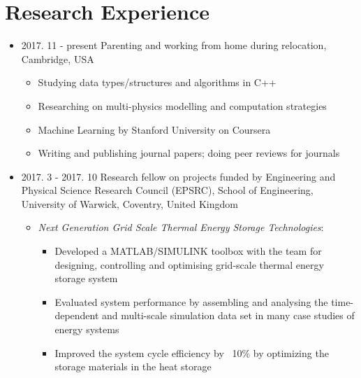 \documentclass[letterpaper]{article}
\begin{document}
\vspace{-12pt}
\section*{Research Experience}
\vspace{-10pt}
\begin{itemize}
\item 2017. 11 - present \hspace{2pt} Parenting and working from home during relocation, Cambridge, USA
		\begin{itemize}
		\item Studying data types/structures and algorithms in C++
		\item Researching on multi-physics modelling and computation strategies
		\item Machine Learning by Stanford University on Coursera
		\item Writing and publishing journal papers; doing peer reviews for journals
		\end{itemize}		
\item 2017. 3 - 2017. 10  \hspace{2pt} Research fellow on projects funded by Engineering and Physical Science Research Council (EPSRC), School of Engineering, University of Warwick, Coventry, United Kingdom
		\begin{itemize}
		\item \textsl{	Next Generation Grid Scale Thermal Energy Storage Technologies}: 
					\begin{itemize}
					\item Developed a MATLAB/SIMULINK toolbox with the team for designing, controlling and optimising grid-scale thermal energy storage system%
					\item Evaluated system performance by assembling and analysing the time-dependent and multi-scale simulation data set in many case studies of energy systems
					\item Improved the system cycle efficiency by ~10\% by optimizing the storage materials in the heat storage
					\end{itemize}


\end{itemize}
\end{itemize}
\end{document}
